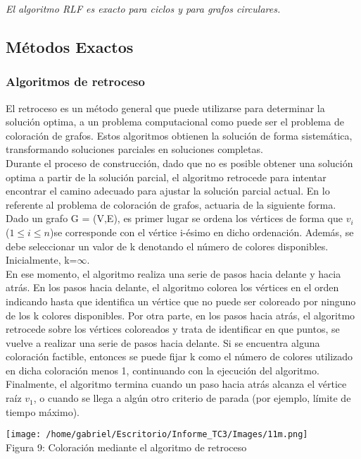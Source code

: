 \documentclass[12pt]{report}
\begin{document}
\begin{tm}
\textsl{El algoritmo RLF es exacto para ciclos y para grafos circulares.}
\end{tm}

\subsection{Métodos Exactos}
\subsubsection{Algoritmos de retroceso}
El retroceso es un método general que puede utilizarse para determinar la solución optima, a un problema computacional como puede ser el problema de coloración de grafos. Estos algoritmos obtienen la solución de forma sistemática, transformando soluciones parciales en soluciones completas.\\
Durante el proceso de construcción, dado que no es posible obtener una solución optima a partir de la solución parcial, el algoritmo retrocede para intentar encontrar el camino adecuado para ajustar la solución parcial actual. En lo referente al problema de coloración de grafos, actuaria de la siguiente forma.\\
Dado un grafo G = (V,E), es primer lugar se ordena los vértices de forma que $v_i$ ($1 \leq i \leq n$)se corresponde con el vértice i-ésimo en dicho ordenación. Además, se debe seleccionar un valor de k denotando el número de colores disponibles. Inicialmente, k=$\infty$.\\
En ese momento, el algoritmo realiza una serie de pasos hacia delante y hacia atrás. En los pasos hacia delante, el algoritmo colorea los vértices en el orden indicando hasta que identifica un vértice que no puede ser coloreado por ninguno de los k colores disponibles. Por otra parte, en los pasos hacia atrás, el algoritmo retrocede sobre los vértices coloreados y trata de identificar en que puntos, se vuelve a realizar una serie de pasos hacia delante. Si se encuentra alguna coloración factible, entonces se puede fijar k como el número de colores utilizado en dicha coloración menos 1, continuando con la ejecución del algoritmo. Finalmente, el algoritmo termina cuando un paso hacia atrás alcanza el vértice raíz $v_1$, o cuando se llega a algún otro criterio de parada (por ejemplo, límite de tiempo máximo).
\begin{center}
\texttt{[image: /home/gabriel/Escritorio/Informe\_TC3/Images/11m.png]}\\
Figura 9: Coloración mediante el algoritmo de retroceso
\end{center}
\end{document}
